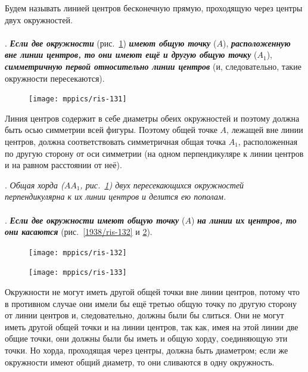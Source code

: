 \documentclass[oneside]{book}
\begin{document}
Будем называть линией центров бесконечную прямую, проходящую через центры двух окружностей. %

\paragraph{}\label{1938/118}
.
\textbf{\emph{Если две окружности}} (рис.~\ref{1938/ris-131}) \textbf{\emph{имеют общую точку}} ($A$), \textbf{\emph{расположенную вне линии центров, то они имеют ещё и другую общую точку}} ($A_1$), \textbf{\emph{симметричную первой относительно линии центров}} (и, следовательно, такие окружности пересекаются).

\begin{figure}[h!]
\centering
\texttt{[image: mppics/ris-131]}
\caption{}\label{1938/ris-131}
\end{figure}

Линия центров содержит в себе диаметры обеих окружностей и поэтому должна быть осью симметрии всей фигуры.
Поэтому общей точке $A$, лежащей вне линии центров, должна соответствовать симметричная общая точка $A_1$, расположенная по другую сторону от оси симметрии 
(на одном перпендикуляре к линии центров и на равном расстоянии от неё). 

\medskip

.
\emph{Общая хорда \emph{($AA_1$, рис.~\ref{1938/ris-131})} двух пересекающихся окружностей перпендикулярна к их линии центров и делится ею пополам.}

\paragraph{}\label{1938/119}
.
\textbf{\emph{Если две окружности имеют общую точку}} ($A$) \textbf{\emph{на линии их центров, то они касаются}} (рис.~\ref{1938/ris-132} и \ref{1938/ris-133}).

\begin{figure}[h!]
\begin{minipage}{.55\textwidth}
\centering
\texttt{[image: mppics/ris-132]}
\caption{}\label{1938/ris-132}
\end{minipage}
\hfill
\begin{minipage}{.41\textwidth}
\centering
\texttt{[image: mppics/ris-133]}
\caption{}\label{1938/ris-133}
\end{minipage}
\end{figure}


Окружности не могут иметь другой общей точки вне линии центров, потому что в противном случае они имели бы ещё третью общую точку по другую сторону от линии центров и, следовательно, должны были бы слиться.
Они не могут иметь другой общей точки и на линии центров, так как, имея на этой линии две общие точки, они должны были бы иметь и общую хорду, соединяющую эти точки.
Но хорда, проходящая через центры, должна быть диаметром;
если же окружности имеют общий диаметр, то они сливаются в одну окружность.
\end{document}
